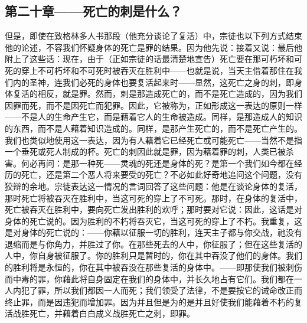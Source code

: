 
\subsection{第二十章——死亡的刺是什么？}

但是，即使在致格林多人书那段（他充分谈论了复活）中，宗徒也以下列方式结束他的论述，不容我们怀疑身体的死亡是罪的结果。因为他先说：接着又说：最后他附上了这些话：现在，由于（正如宗徒的话最清楚地宣告）死亡要在那可朽坏和可死的穿上不可朽坏和不可死时被吞灭在胜利中——也就是说，当天主借着那住在我们内的圣神，连我们必死的身体也要复活起来时——显然，这死亡之身的刺，即身体复活的相反，就是罪。然而，刺是那造成死亡的，而不是死亡造成的，因为我们因罪而死，而不是因死亡而犯罪。因此，它被称为，正如形成这一表达的原则一样——不是人的生命产生它，而是藉着它人的生命被造成。同样，是那造成人的知识的东西，而不是人藉着知识造成的。同样，是那产生死亡的，而不是死亡产生的。我们也类似地使用这一表达，因为有人藉着它已经死亡或可能死亡——当然不是指一个垂死或死人制成的杯。死亡的刺因此就是罪，因为藉着罪的刺，人类已被杀害。何必再问：是那一种死——灵魂的死还是身体的死？是第一个我们如今都在经历的死亡，还是第二个恶人将来要受的死亡？不必如此好奇地追问这个问题，没有狡辩的余地。宗徒表达这一情况的言词回答了这些问题：他是在谈论身体的复活，那时死亡将被吞灭在胜利中，当这可死的穿上了不可死。那时，在身体的复活中，死亡被吞灭在胜利中，要向死亡发出胜利的欢呼；那时要对它说：因此，这话是对身体的死亡说的。因为胜利的不朽将吞灭它，当这可死的穿上了不朽。我重复，这是对身体的死亡说的：——你藉以征服一切的胜利，连天主子都与你交战，祂没有退缩而是与你角力，并胜过了你。在那些死去的人中，你征服了；但在这些复活的人中，你自身被征服了。你的胜利只是暂时的，你在其中吞没了他们的身体。我们的胜利将是永恒的，你在其中被吞没在那些复活的身体中。——即那使我们被刺伤而中毒的罪，你藉此将自身固定在我们的身体中，并长久地占有它们。我们都在一人内犯了罪，所以我们都因一人而死；我们领受了法律，不是要按它的诫命改正而终止罪，而是因违犯而增加罪。因为并且但是为的是并且好使我们能藉着不朽的复活战胜死亡，并藉着白白成义战胜死亡之刺，即罪。\par

